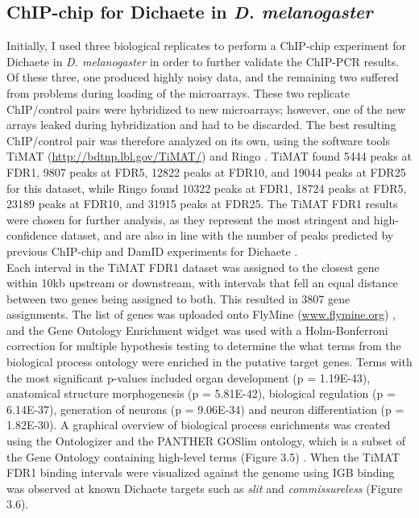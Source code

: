 \subsection{ChIP-chip for Dichaete in \emph{D. melanogaster}}
Initially, I used three biological replicates to perform a ChIP-chip experiment for Dichaete in \emph{D. melanogaster} in order to further validate the ChIP-PCR results. Of these three, one produced highly noisy data, and the remaining two suffered from problems during loading of the microarrays. These two replicate ChIP/control pairs were hybridized to new microarrays; however, one of the new arrays leaked during hybridization and had to be discarded. The best resulting ChIP/control pair was therefore analyzed on its own, using the software tools TiMAT (\url{http://bdtnp.lbl.gov/TiMAT/}) and Ringo \citep{toedling_ringo_2007}. TiMAT found 5444 peaks at FDR1, 9807 peaks at FDR5, 12822 peaks at FDR10, and 19044 peaks at FDR25 for this dataset, while Ringo found 10322 peaks at FDR1, 18724 peaks at FDR5, 23189 peaks at FDR10, and 31915 peaks at FDR25. The TiMAT FDR1 results were chosen for further analysis, as they represent the most stringent and high-confidence dataset, and are also in line with the number of peaks predicted by previous ChIP-chip and DamID experiments for Dichaete \citep{aleksic_role_2013}.\\

Each interval in the TiMAT FDR1 dataset was assigned to the closest gene within 10kb upstream or downstream, with intervals that fell an equal distance between two genes being assigned to both. This resulted in 3807 gene assignments. The list of genes was uploaded onto FlyMine (\url{www.flymine.org}) \citep{lyne_flymine:_2007}, and the Gene Ontology Enrichment widget was used with a Holm-Bonferroni correction for multiple hypothesis testing to determine the what terms from the biological process ontology were enriched in the putative target genes. Terms with the most significant p-values included organ development (p = 1.19E-43), anatomical structure morphogenesis (p = 5.81E-42), biological regulation (p = 6.14E-37), generation of neurons (p = 9.06E-34) and neuron differentiation (p = 1.82E-30). A graphical overview of biological process enrichments was created using the Ontologizer and the PANTHER GOSlim ontology, which is a subset of the Gene Ontology containing high-level terms (Figure 3.5) \citep{bauer_ontologizer_2008}. When the TiMAT FDR1 binding intervals were visualized against the genome using IGB \cite{nicol_integrated_2009} binding was observed at known Dichaete targets such as \emph{slit} and \emph{commissureless} (Figure 3.6).\\

